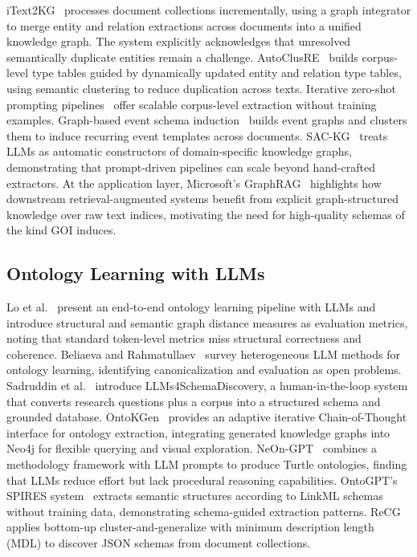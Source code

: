 \documentclass[runningheads,a4paper]{llncs}
\begin{document}
iText2KG~\cite{lairgi2024itext2kg} processes document collections
incrementally, using a graph integrator to merge entity and relation
extractions across documents into a unified knowledge graph. The system
explicitly acknowledges that unresolved semantically duplicate entities
remain a challenge. AutoClusRE~\cite{wang2024autoclusre} builds
corpus-level type tables guided by dynamically updated entity and
relation type tables, using semantic clustering to reduce duplication
across texts. Iterative zero-shot prompting
pipelines~\cite{giglou2024llms4ol_overview} offer scalable corpus-level
extraction without training examples. Graph-based event schema
induction~\cite{xu2021graph} builds event graphs and clusters them to
induce recurring event templates across documents. SAC-KG~\cite{chen2024sackg}
treats LLMs as automatic constructors of domain-specific knowledge
graphs, demonstrating that prompt-driven pipelines can scale beyond
hand-crafted extractors. At the application layer, Microsoft's
GraphRAG~\cite{edge2024graphrag} highlights how downstream
retrieval-augmented systems benefit from explicit graph-structured
knowledge over raw text indices, motivating the need for high-quality
schemas of the kind GOI induces.

\subsection{Ontology Learning with LLMs}

Lo et al.~\cite{lo2024endtoend} present an end-to-end ontology learning
pipeline with LLMs and introduce structural and semantic graph distance
measures as evaluation metrics, noting that standard token-level metrics
miss structural correctness and coherence. Beliaeva and
Rahmatullaev~\cite{beliaeva2025} survey heterogeneous LLM methods for
ontology learning, identifying canonicalization and evaluation as open
problems. Sadruddin et al.~\cite{sadruddin2025} introduce
LLMs4SchemaDiscovery, a human-in-the-loop system that converts research
questions plus a corpus into a structured schema and grounded database.
OntoKGen~\cite{abolhasani2025ontokgen} provides an adaptive iterative
Chain-of-Thought interface for ontology extraction, integrating
generated knowledge graphs into Neo4j for flexible querying and visual
exploration. NeOn-GPT~\cite{fathallah2024neongpt} combines a methodology
framework with LLM prompts to produce Turtle ontologies, finding that
LLMs reduce effort but lack procedural reasoning capabilities. OntoGPT's
SPIRES system~\cite{caufield2024spires} extracts semantic structures
according to LinkML schemas without training data, demonstrating
schema-guided extraction patterns. ReCG~\cite{yun2024recg} applies
bottom-up cluster-and-generalize with minimum description length (MDL)
to discover JSON schemas from document collections.
\end{document}
